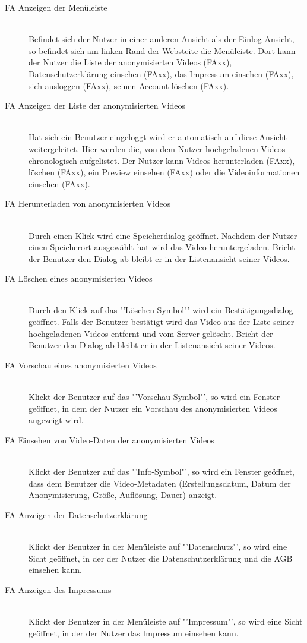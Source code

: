 \begin{description}
\item[FA Anzeigen der Menüleiste] \hfill \\
Befindet sich der Nutzer in einer anderen Ansicht als der Einlog-Ansicht, so befindet sich am linken Rand der Websteite die Menüleiste. Dort kann der Nutzer die Liste der anonymisierten Videos (FAxx), Datenschutzerklärung einsehen (FAxx), das Impressum einsehen (FAxx), sich ausloggen (FAxx), seinen Account löschen (FAxx).

\item[FA Anzeigen der Liste der anonymisierten Videos] \hfill \\
Hat sich ein Benutzer eingeloggt wird er automatisch auf diese Ansicht weitergeleitet. Hier werden die, von dem Nutzer hochgeladenen Videos chronologisch aufgelistet. Der Nutzer kann Videos herunterladen (FAxx), löschen (FAxx), ein Preview einsehen (FAxx) oder die Videoinformationen einsehen (FAxx).

\item[FA Herunterladen von anonymisierten Videos] \hfill \\
Durch einen Klick wird eine Speicherdialog geöffnet. Nachdem der Nutzer einen Speicherort ausgewählt hat wird das Video heruntergeladen. Bricht der Benutzer den Dialog ab bleibt er in der Listenansicht seiner Videos.

\item[FA Löschen eines anonymisierten Videos] \hfill \\
Durch den Klick auf das "'Löschen-Symbol"' wird ein Bestätigungsdialog geöffnet. Falls der Benutzer bestätigt wird das Video aus der Liste seiner hochgeladenen Videos entfernt und vom Server gelöscht. Bricht der Benutzer den Dialog ab bleibt er in der Listenansicht seiner Videos.

\item[FA Vorschau eines anonymisierten Videos] \hfill \\
Klickt der Benutzer auf das "'Vorschau-Symbol"', so wird ein Fenster geöffnet, in dem der Nutzer ein Vorschau des anonymisierten Videos angezeigt wird.

\item[FA Einsehen von Video-Daten der anonymisierten Videos] \hfill \\
Klickt der Benutzer auf das "'Info-Symbol"', so wird ein Fenster geöffnet, dass dem Benutzer die Video-Metadaten (Erstellungsdatum, Datum der Anonymisierung, Größe, Auflösung, Dauer) anzeigt.

\item[FA Anzeigen der Datenschutzerklärung] \hfill \\
Klickt der Benutzer in der Menüleiste auf "'Datenschutz"', so wird eine Sicht geöffnet, in der der Nutzer die Datenschutzerklärung und die AGB einsehen kann.

\item[FA Anzeigen des Impressums] \hfill \\
Klickt der Benutzer in der Menüleiste auf "'Impressum"', so wird eine Sicht geöffnet, in der der Nutzer das Impressum einsehen kann.

\end{description}